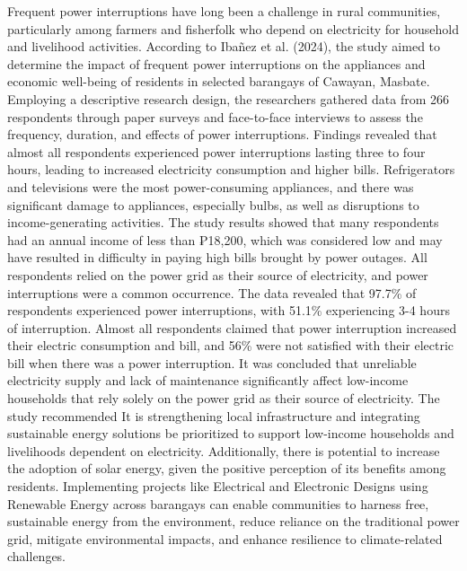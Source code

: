 {Frequent power interruptions have long been a challenge in rural communities, particularly among farmers and fisherfolk who depend on electricity for household and livelihood activities. According to Ibañez et al. (2024), the study aimed to determine the impact of frequent power interruptions on the appliances and economic well-being of residents in selected barangays of Cawayan, Masbate. Employing a descriptive research design, the researchers gathered data from 266 respondents through paper surveys and face-to-face interviews to assess the frequency, duration, and effects of power interruptions. Findings revealed that almost all respondents experienced power interruptions lasting three to four hours, leading to increased electricity consumption and higher bills. Refrigerators and televisions were the most power-consuming appliances, and there was significant damage to appliances, especially bulbs, as well as disruptions to income-generating activities. The study results showed that many respondents had an annual income of less than ₱18,200, which was considered low and may have resulted in difficulty in paying high bills brought by power outages. All respondents relied on the power grid as their source of electricity, and power interruptions were a common occurrence. The data revealed that 97.7\% of respondents experienced power interruptions, with 51.1\% experiencing 3-4 hours of interruption. Almost all respondents claimed that power interruption increased their electric consumption and bill, and 56\% were not satisfied with their electric bill when there was a power interruption. It was concluded that unreliable electricity supply and lack of maintenance significantly affect low-income households that rely solely on the power grid as their source of electricity. The study recommended It is strengthening local infrastructure and integrating sustainable energy solutions be prioritized to support low-income households and livelihoods dependent on electricity. Additionally, there is potential to increase the adoption of solar energy, given the positive perception of its benefits among residents. Implementing projects like Electrical and Electronic Designs using Renewable Energy across barangays can enable communities to harness free, sustainable energy from the environment, reduce reliance on the traditional power grid, mitigate environmental impacts, and enhance resilience to climate-related challenges.

}
